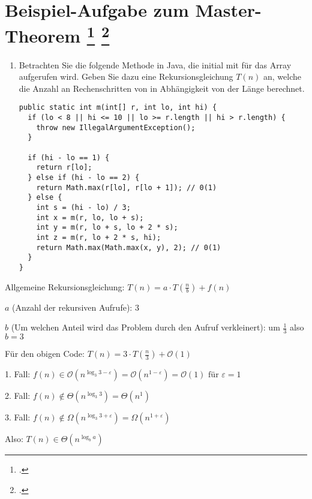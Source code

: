 \documentclass{lehramt-informatik-aufgabe}
\begin{document}

\section{Beispiel-Aufgabe zum Master-Theorem 
\footcite[Seite 39 (PDF 26)]{aud:fs:2}
\footcite[Thema 2 Aufgabe 6]{examen:66115:2018:03}
}

\begin{enumerate}

\item Betrachten Sie die folgende Methode  in Java, die initial
mit  für das Array  aufgerufen wird.
Geben Sie dazu eine Rekursionsgleichung $T(n)$ an, welche die Anzahl an
Rechenschritten von  in Abhängigkeit von der Länge
 berechnet.

\begin{verbatim}
public static int m(int[] r, int lo, int hi) {
  if (lo < 8 || hi <= 10 || lo >= r.length || hi > r.length) {
    throw new IllegalArgumentException();
  }

  if (hi - lo == 1) {
    return r[lo];
  } else if (hi - lo == 2) {
    return Math.max(r[lo], r[lo + 1]); // 0(1)
  } else {
    int s = (hi - lo) / 3;
    int x = m(r, lo, lo + s);
    int y = m(r, lo + s, lo + 2 * s);
    int z = m(r, lo + 2 * s, hi);
    return Math.max(Math.max(x, y), 2); // 0(1)
  }
}
\end{verbatim}
\end{enumerate}

\begin{antwort}

Allgemeine Rekursionsgleichung: $T(n) = a \cdot T(\frac{n}{b}) + f(n)$

$a$ (Anzahl der rekursiven Aufrufe): 3

$b$ (Um welchen Anteil wird das Problem durch den Aufruf verkleinert):
um $\frac{1}{3}$ also $b = 3$

Für den obigen Code:  $T(n) = 3 \cdot T(\frac{n}{3}) + \mathcal{O}(1)$

1. Fall:
$f(n) \in \mathcal{O}\left(n^{\log_{3}3-\varepsilon}\right) =
\mathcal{O}\left(n^{1-\varepsilon}\right) =
\mathcal{O}\left(1\right) \text{ für } \varepsilon = 1
$

2. Fall:
$f(n) \notin \Theta \left(n^{{\log_{3}3}}\right) =
\Theta \left(n^1\right)
$

3. Fall:
$f(n) \notin \Omega \left(n^{\log_{3}3 + \varepsilon}\right) =
\Omega \left(n^{1 + \varepsilon}\right)$

Also: $T(n)\in \Theta \left(n^{\log_{b}a}\right)$
\end{antwort}
\end{document}

